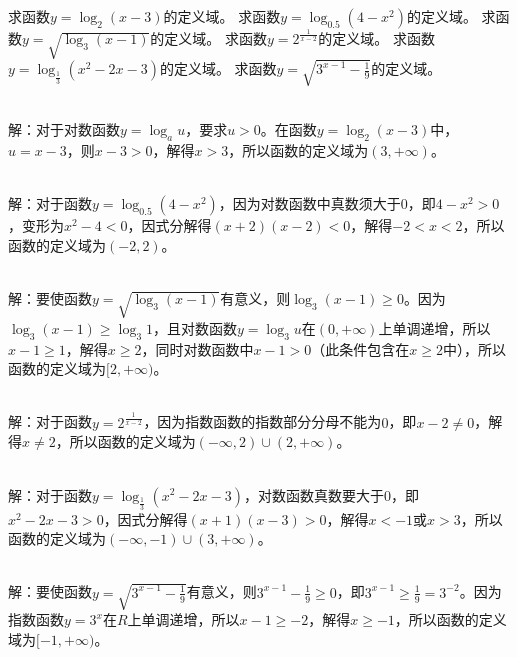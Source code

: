 \begin{Exercise}[title={对数函数和指数函数定义域练习}, label={ex:logarithm}]
    \Question 求函数\(y = \log_2(x - 3)\)的定义域。
    \Question 求函数\(y = \log_{0.5}(4 - x^2)\)的定义域。
    \Question 求函数\(y = \sqrt{\log_3(x - 1)}\)的定义域。
    \Question 求函数\(y = 2^{\frac{1}{x - 2}}\)的定义域。
    \Question 求函数\(y = \log_{\frac{1}{3}}(x^2 - 2x - 3)\)的定义域。
    \Question 求函数\(y = \sqrt{3^{x - 1}- \frac{1}{9}}\)的定义域。
\end{Exercise}
\begin{MyAnswer}[ref={ex:logarithm}]
        \Question {}\\ 解：对于对数函数\(y = \log_a u\)，要求\(u>0\)。在函数\(y = \log_2(x - 3)\)中，\(u=x - 3\)，则\(x - 3>0\)，解得\(x>3\)，所以函数的定义域为\((3,+\infty)\)。

        \Question {}\\ 解：对于函数\(y = \log_{0.5}(4 - x^2)\)，因为对数函数中真数须大于\(0\)，即\(4 - x^2>0\)，变形为\(x^2 - 4<0\)，因式分解得\((x + 2)(x - 2)<0\)，解得\(-2<x<2\)，所以函数的定义域为\((-2,2)\)。

        \Question  \mybox{答案为\([2,+\infty)\);}\\  解：要使函数\(y = \sqrt{\log_3(x - 1)}\)有意义，则\(\log_3(x - 1)\ge0\)。因为\(\log_3(x - 1)\ge\log_3 1\)，且对数函数\(y = \log_3 u\)在\((0,+\infty)\)上单调递增，所以\(x - 1\ge1\)，解得\(x\ge2\)，同时对数函数中\(x - 1>0\)（此条件包含在\(x\ge2\)中），所以函数的定义域为\([2,+\infty)\)。

        \Question {}\\ 解：对于函数\(y = 2^{\frac{1}{x - 2}}\)，因为指数函数的指数部分分母不能为\(0\)，即\(x - 2\neq0\)，解得\(x\neq2\)，所以函数的定义域为\((-\infty,2)\cup(2,+\infty)\)。

        \Question {}\\ 解：对于函数\(y = \log_{\frac{1}{3}}(x^2 - 2x - 3)\)，对数函数真数要大于\(0\)，即\(x^2 - 2x - 3>0\)，因式分解得\((x + 1)(x - 3)>0\)，解得\(x<-1\)或\(x>3\)，所以函数的定义域为\((-\infty,-1)\cup(3,+\infty)\)。

        \Question  \mybox{答案为\([-1,+\infty)\);}\\  解：要使函数\(y = \sqrt{3^{x - 1}- \frac{1}{9}}\)有意义，则\(3^{x - 1}- \frac{1}{9}\ge0\)，即\(3^{x - 1}\ge\frac{1}{9}=3^{-2}\)。因为指数函数\(y = 3^x\)在\(R\)上单调递增，所以\(x - 1\ge - 2\)，解得\(x\ge - 1\)，所以函数的定义域为\([-1,+\infty)\)。
\end{MyAnswer}

